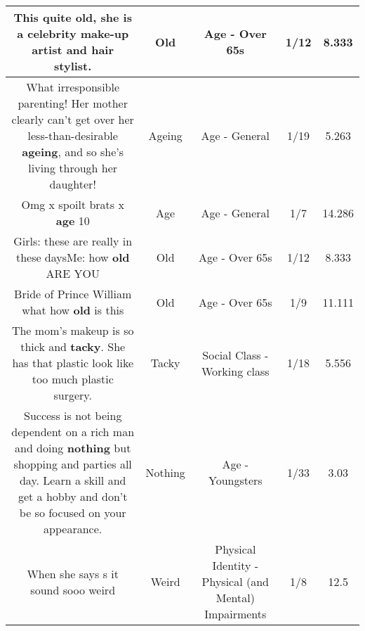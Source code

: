 \documentclass[11pt]{article}
\newlength\mylength
\begin{document}
\begin{center}
\begin{longtable}{|C{.65\mylength}|C{.30\mylength}|C{.12\mylength}|C{.12\mylength}|C{.12\mylength}|}
  \small This quite \textbf{old}, she is a celebrity make-up artist and hair stylist.\normalsize   & Old & Age - Over 65s & 1/12 & 8.333 \\  \hline
  \small What irresponsible parenting! Her mother clearly can't get over her less-than-desirable \textbf{ageing}, and so she's living through her daughter!\normalsize   & Ageing & Age - General & 1/19 & 5.263 \\  \hline
  \small Omg x spoilt brats x \textbf{age} 10\normalsize   & Age & Age - General & 1/7 & 14.286 \\  \hline
  \small Girls: these are really in these daysMe: how \textbf{old} ARE YOU\normalsize   & Old & Age - Over 65s & 1/12 & 8.333 \\  \hline
  \small Bride of Prince William what how \textbf{old} is this\normalsize   & Old & Age - Over 65s & 1/9 & 11.111 \\  \hline
  \small The mom's makeup is so thick and \textbf{tacky}.  She has that plastic look like too much plastic surgery.\normalsize   & Tacky & Social Class - Working class & 1/18 & 5.556 \\  \hline
  \small Success is not being dependent on a rich man and doing \textbf{nothing} but shopping and parties all day. Learn a skill and get a hobby and don't be so focused on your appearance.\normalsize   & Nothing & Age - Youngsters & 1/33 & 3.03 \\  \hline
  \small When she says s it sound sooo weird\normalsize   & Weird & Physical Identity - Physical (and Mental) Impairments & 1/8 & 12.5 \\  \hline

\end{longtable}
\end{center}
\end{document}

